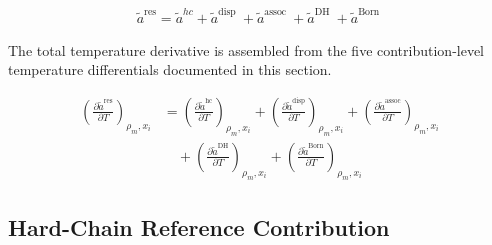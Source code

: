 \documentclass[12pt, letterpaper]{article}
\begin{document}

\begin{align}
    \tilde{a}^{\mathrm{res}}=\tilde{a}^{h c}+\tilde{a}^{\text {disp }}+\tilde{a}^{\text {assoc }}+\tilde{a}^{\text {DH }}+\tilde{a}^{\text {Born }}
    \label{eq:ares_total}
\end{align}

The total temperature derivative is assembled from the five contribution-level temperature differentials documented in this section.

\begin{equation}
    \begin{aligned}
        \left(\frac{\partial\tilde{a}^\mathrm{res}}{\partial T}\right)_{\rho_m,x_{i}}
        &=\left(\frac{\partial\tilde{a}^\mathrm{hc}}{\partial T}\right)_{\rho_m,x_{i}}
        +\left(\frac{\partial\tilde{a}^\mathrm{disp}}{\partial T}\right)_{\rho_m,x_{i}}
        +\left(\frac{\partial\tilde{a}^\mathrm{assoc}}{\partial T}\right)_{\rho_m,x_{i}}
        \\
        &\quad
        +\left(\frac{\partial\tilde{a}^\mathrm{DH}}{\partial T}\right)_{\rho_m,x_{i}}
        +\left(\frac{\partial\tilde{a}^\mathrm{Born}}{\partial T}\right)_{\rho_m,x_{i}}
    \end{aligned}
    \label{eq:dares_dT}
\end{equation}

\subsection{Hard-Chain Reference Contribution}

\end{document}
